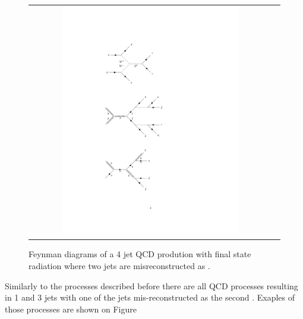 \begin{figure}[tbh!]
	\centering
	\begin{tabular}{cc}
		\includegraphics[width=0.75\textwidth]{diagrams/pics/background_QCDfinrad.pdf}
	\end{tabular}
	\caption{Feynman diagrams of a 4 jet QCD prodution with final state radiation where two jets are misreconstructed as \hadtau. }
	\label{fig:background_QCDfinrad}
\end{figure}

Similarly to the processes described before there are all QCD processes resulting in 1 \hadtau and 3 jets with one of the jets mis-reconstructed as the second \hadtau. Exaples of those processes are shown on Figure

